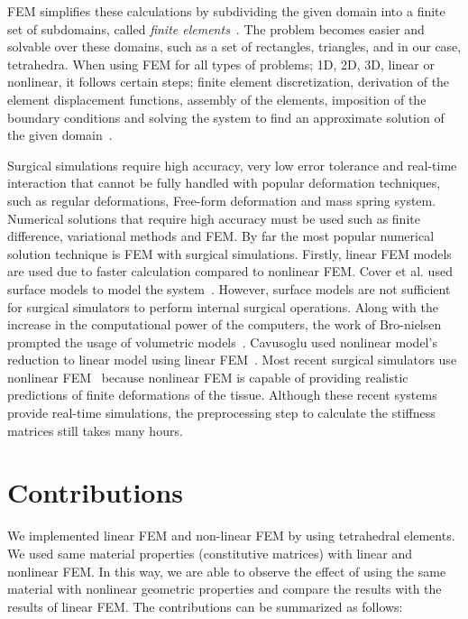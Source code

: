 FEM simplifies these calculations by subdividing the given domain into a finite set of subdomains, called \textit{finite elements}~\cite{Reddy93}. The problem becomes easier and solvable over these domains, such as a set of rectangles, triangles, and in our case, tetrahedra. When using FEM for all types of problems; 1D, 2D, 3D, linear or nonlinear, it follows certain steps; finite element discretization, derivation of the element displacement functions, assembly of the elements, imposition of the boundary conditions and solving the system to find an approximate solution of the given domain~\cite{Reddy93}.

Surgical simulations require high accuracy, very low error tolerance and real-time interaction that cannot be fully handled with popular deformation techniques, such as regular deformations, Free-form deformation and mass spring system. Numerical solutions that require high accuracy must be used such as finite difference, variational methods and FEM. By far the most popular numerical solution technique is FEM with surgical simulations. Firstly, linear FEM models are used due to faster calculation compared to nonlinear FEM. Cover et al. used surface models to model the system~\cite{Cover93}. However, surface models are not sufficient for surgical simulators to perform internal surgical operations. Along with the increase in the computational power of the computers, the work of Bro-nielsen prompted the usage of volumetric models~\cite{Bro96}. Cavusoglu used nonlinear model's reduction to linear model using linear FEM~\cite{Cavusoglu00}. Most recent surgical simulators use nonlinear FEM~\cite{Taylor07,Horton2010} because nonlinear FEM is capable of providing realistic predictions of finite deformations of the tissue. Although these recent systems provide real-time simulations, the preprocessing step to calculate the stiffness matrices still takes many hours.

\section{Contributions}

We implemented linear FEM and non-linear FEM by using tetrahedral elements. We used same material properties (constitutive matrices) with linear and nonlinear FEM. In this way, we are able to observe the effect of using the same material with nonlinear geometric properties and compare the results with the results of linear FEM. The contributions can be summarized as follows:


